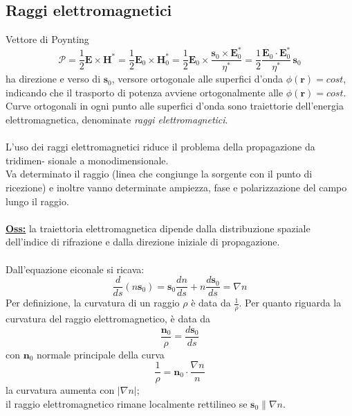 \documentclass[a4paper]{article}
\begin{document}
\subsection*{Raggi elettromagnetici}
Vettore di Poynting
\begin{equation*}
\bm{\mathcal{P}}=\frac{1}{2}\textbf{E}\times\textbf{H}^*=\frac{1}{2}\textbf{E}_0\times\textbf{H}_0^*=\frac{1}{2}\textbf{E}_0\times\frac{\textbf{s}_0\times\textbf{E}_0^*}{\eta^*}=\frac{1}{2}\frac{\textbf{E}_0\cdot\textbf{E}_0^*}{\eta^*}\,\textbf{s}_0
\end{equation*}
ha direzione e verso di $\textbf{s}_0$, versore ortogonale alle superfici d'onda $\phi(\textbf{r})=cost$, indicando che il trasporto di potenza avviene ortogonalmente alle $\phi(\textbf{r})=cost$. Curve ortogonali in ogni punto alle superfici d'onda sono traiettorie dell'energia elettromagnetica, denominate \emph{raggi elettromagnetici}.\\\\
L’uso dei raggi elettromagnetici riduce il problema della propagazione da tridimen-
sionale a monodimensionale.\\
Va determinato il raggio (linea che congiunge la sorgente con il punto di ricezione)
e inoltre vanno determinate ampiezza, fase e polarizzazione del campo lungo il raggio.\\\\
\underline{\textbf{Oss:}} la traiettoria elettromagnetica dipende dalla distribuzione spaziale dell’indice di rifrazione e dalla direzione iniziale di propagazione.\\\\
Dall'equazione eiconale si ricava:
\begin{equation*}
\frac{d}{ds}(n\textbf{s}_0)=\textbf{s}_0\frac{dn}{ds}+n\frac{d\textbf{s}_0}{ds}=\nabla n
\end{equation*}
Per definizione, la curvatura di un raggio $\rho$ è data da $\frac{1}{\rho}$. Per quanto riguarda la curvatura del raggio elettromagnetico, è data da
\begin{equation*}
\frac{\textbf{n}_0}{\rho}=\frac{d\textbf{s}_0}{ds}
\end{equation*}
con $\textbf{n}_0$ normale principale della curva
\begin{equation*}
\frac{1}{\rho}=\textbf{n}_0\cdot\frac{\nabla n}{n}
\end{equation*}
la curvatura aumenta con $|\nabla n|$;\\
il raggio elettromagnetico rimane localmente rettilineo se $\textbf{s}_0\parallel\nabla n$.
\end{document}

